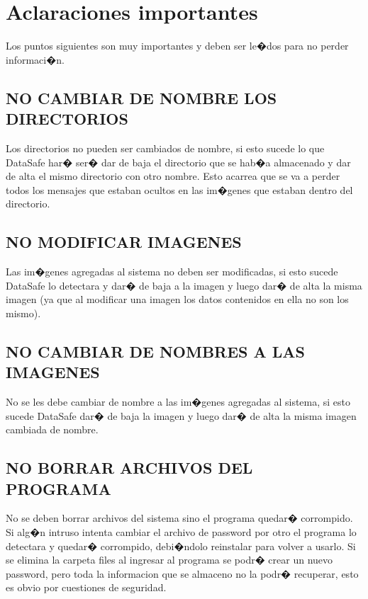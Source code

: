 \documentclass[12pt]{article}
\numberwithin{equation}{section}
\numberwithin{figure}{section}
\numberwithin{table}{section}
\begin{document}
\section{Aclaraciones importantes}
Los puntos siguientes son muy importantes y deben ser le�dos para no perder informaci�n.

\subsection{NO CAMBIAR DE NOMBRE LOS DIRECTORIOS}
Los directorios no pueden ser cambiados de nombre, si esto sucede lo que DataSafe har� ser� dar de baja el directorio que se hab�a almacenado y dar de alta el mismo directorio con otro nombre. Esto acarrea que se va a perder todos los mensajes que estaban ocultos en las im�genes que estaban dentro del directorio.

\subsection{NO MODIFICAR IMAGENES}
Las im�genes agregadas al sistema no deben ser modificadas, si esto sucede DataSafe lo detectara y dar� de baja a la imagen y luego dar� de alta la misma imagen (ya que al modificar una imagen los datos contenidos en ella no son los mismo).

\subsection{NO CAMBIAR DE NOMBRES A LAS IMAGENES}
No se les debe cambiar de nombre a las im�genes agregadas al sistema, si esto sucede DataSafe dar� de baja la imagen y luego dar� de alta la misma imagen cambiada de nombre.

\subsection{NO BORRAR ARCHIVOS DEL PROGRAMA}
No se deben borrar archivos del sistema sino el programa quedar� corrompido.
Si alg�n intruso intenta cambiar el archivo de password por otro el programa lo detectara y quedar� corrompido, debi�ndolo reinstalar para volver a usarlo. Si se elimina la carpeta files al ingresar al programa se podr� crear un nuevo password, 
pero toda la informacion que se almaceno no la podr� recuperar, esto es obvio por cuestiones de seguridad.
\end{document}
